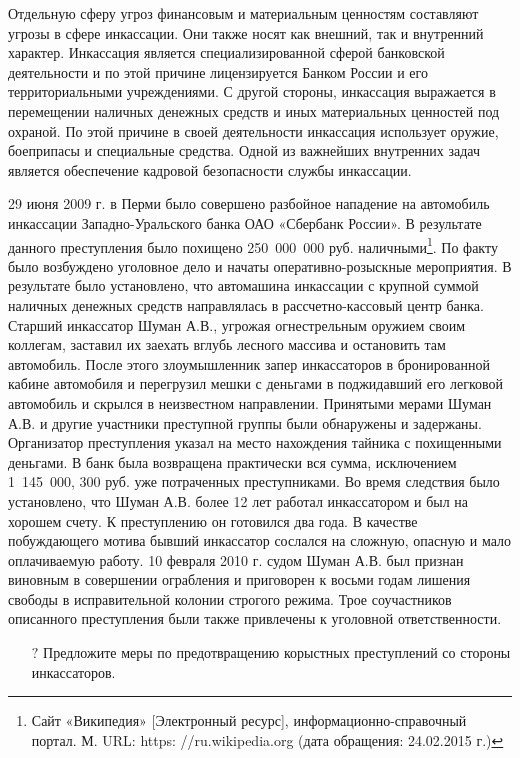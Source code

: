 \documentclass[a4paper,12pt,fleqn]{article} %
\begin{document}
Отдельную сферу угроз финансовым и материальным ценностям составляют угрозы в сфере инкассации. Они также носят как внешний, так и внутренний характер. Инкассация является специализированной сферой банковской деятельности и по этой причине лицензируется Банком России и его территориальными учреждениями. С другой стороны, инкассация выражается в перемещении наличных денежных средств и иных материальных ценностей под охраной. По этой причине в своей деятельности инкассация использует оружие, боеприпасы и специальные средства.  Одной из важнейших внутренних задач является обеспечение кадровой безопасности службы инкассации.\\


\begin{tcolorbox}[colback=blue!55!red!5!,colframe=blue!55!red,enforce breakable,%
	pad at break=1mm, title=Кейс 30. Чрезвычайное происшествие в Перми]
	
29 июня 2009 г. в Перми было совершено разбойное нападение на автомобиль инкассации Западно-Уральского банка ОАО «Сбербанк России». В результате данного преступления было похищено 250 000 000 руб. наличными\footnote{Сайт «Википедия» [Электронный ресурс], информационно-справочный портал. М. URL: https: //ru.wikipedia.org (дата обращения: 24.02.2015 г.)}. По факту было возбуждено уголовное дело и начаты оперативно-розыскные мероприятия. В результате было установлено, что автомашина инкассации с крупной суммой наличных денежных средств направлялась в рассчетно-кассовый центр банка. Старший инкассатор Шуман А.В., угрожая огнестрельным оружием своим коллегам, заставил их заехать вглубь лесного массива и остановить там автомобиль. После этого злоумышленник запер инкассаторов в бронированной кабине автомобиля и перегрузил мешки с деньгами в поджидавший его легковой автомобиль и скрылся в неизвестном направлении. Принятыми мерами Шуман А.В. и другие участники преступной группы были обнаружены и задержаны. Организатор преступления указал на место нахождения тайника с похищенными деньгами. В банк была возвращена практически вся сумма, исключением 1 145 000, 300 руб. уже потраченных преступниками. Во время следствия было установлено, что Шуман А.В. более 12 лет работал инкассатором и был на хорошем счету. К преступлению он готовился два года. В качестве побуждающего мотива бывший инкассатор сослался на сложную, опасную и мало оплачиваемую работу. 10 февраля 2010 г. судом Шуман А.В. был признан виновным в совершении ограбления и приговорен к восьми годам лишения свободы в исправительной колонии строгого режима. Трое соучастников описанного преступления были также привлечены к уголовной ответственности.	

\begin{itemize}
	\item[{\color{blue!55!red}\Huge {  $ ? $}} \quad]   Предложите меры по предотвращению корыстных преступлений со стороны инкассаторов.
\end{itemize}	
	
\end{tcolorbox}
	
\end{document}
